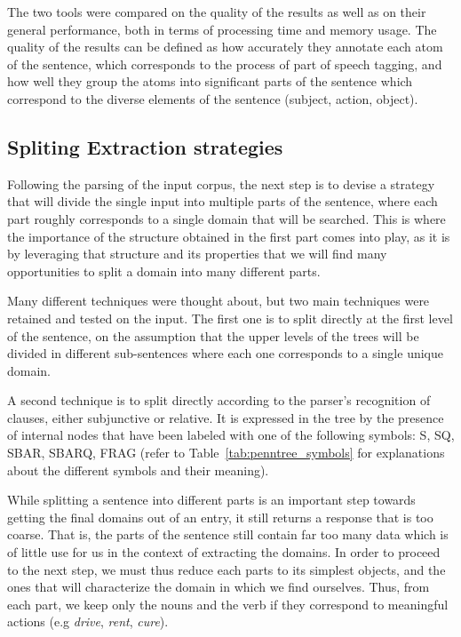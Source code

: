 The two tools were compared on the quality of the results as well as on their general performance, both in terms of processing time and memory usage. The quality of the results can be defined as how accurately they annotate each atom of the sentence, which corresponds to the process of part of speech tagging, and how well they group the atoms into significant parts of the sentence which correspond to the diverse elements of the sentence (subject, action, object).


\subsection{Spliting \amper Extraction strategies} %
\label{sub:extraction_strategies}

Following the parsing of the input corpus, the next step is to devise a strategy that will divide the single input into multiple parts of the sentence, where each part roughly corresponds to a single domain that will be searched. This is where the importance of the structure obtained in the first part comes into play, as it is by leveraging that structure and its properties that we will find many opportunities to split a domain into many different parts.

Many different techniques were thought about, but two main techniques were retained and tested on the input. The first one is to split directly at the first level of the sentence, on the assumption that the upper levels of the trees will be divided in different sub-sentences where each one corresponds to a single unique domain.

A second technique is to split directly according to the parser's recognition of clauses, either subjunctive or relative. It is expressed in the tree by the presence of internal nodes that have been labeled with one of the following symbols: S, SQ, SBAR, SBARQ, FRAG (refer to Table~\ref{tab:penntree_symbols} for explanations about the different symbols and their meaning).

While splitting a sentence into different parts is an important step towards getting the final domains out of an entry, it still returns a response that is too coarse. That is, the parts of the sentence still contain far too many data which is of little use for us in the context of extracting the domains. In order to proceed to the next step, we must thus reduce each parts to its simplest objects, and the ones that will characterize the domain in which we find ourselves. Thus, from each part, we keep only the nouns and the verb if they correspond to meaningful actions (e.g \emph{drive}, \emph{rent}, \emph{cure}).

